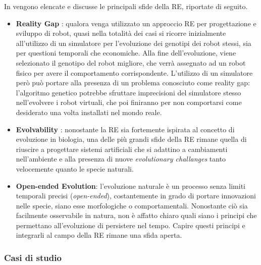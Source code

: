 \documentclass[a4paper,12pt]{article}
\begin{document}
In \cite{ERWWW} vengono elencate e discusse le principali sfide della RE, riportate di seguito.
\begin{itemize}
	\item \textbf{Reality Gap} : qualora venga utilizzato un approccio RE per progettazione e sviluppo di robot, quasi nella totalità dei casi
	si ricorre inizialmente all'utilizzo di un simulatore per l'evoluzione dei genotipi dei robot stessi, sia per questioni temporali che economiche. Alla fine dell'evoluzione, viene selezionato il genotipo del robot migliore, che verrà assegnato ad un robot fisico per avere il comportamento corrispondente. L'utilizzo di un simulatore però può portare alla presenza di un problema conosciuto come reality gap: l'algoritmo genetico potrebbe sfruttare imprecisioni del simulatore stesso nell'evolvere i robot virtuali, che poi finiranno per non comportarsi come desiderato una volta installati nel mondo reale.
	\item \textbf{Evolvability} : nonostante la RE sia fortemente ispirata al concetto di evoluzione in biologia, una delle più grandi sfide della RE rimane quella di riuscire a progettare sistemi artificiali che si adattino a cambiamenti nell'ambiente e alla presenza di nuove \emph{evolutionary challanges} tanto velocemente quanto le specie naturali.
	\item \textbf{Open-ended Evolution}: l'evoluzione naturale è un processo senza limiti temporali precisi (\emph{open-ended}), costantemente in grado di portare innovazioni nelle specie, siano esse morfologiche o comportamentali. Nonostante ciò sia facilmente osservabile in natura, non è affatto chiaro quali siano i principi che permettano all'evoluzione di persistere nel tempo. Capire questi principi e integrarli al campo della RE rimane una sfida aperta.
\end{itemize}

\subsubsection{Casi di studio}
\end{document}
